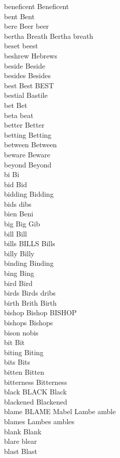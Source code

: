 beneficent Beneficent\\
bent Bent\\
bere Beer beer\\
bertha Breath Bertha breath\\
beset beest\\
beshrew Hebrews\\
beside Beside\\
besides Besides\\
best Best BEST\\
bestial Bastile\\
bet Bet\\
beta beat\\
better Better\\
betting Betting\\
between Between\\
beware Beware\\
beyond Beyond\\
bi Bi\\
bid Bid\\
bidding Bidding\\
bids dibs\\
bien Beni\\
big Big Gib\\
bill Bill\\
bills BILLS Bills\\
billy Billy\\
binding Binding\\
bing Bing\\
bird Bird\\
birds Birds dribs\\
birth Brith Birth\\
bishop Bishop BISHOP\\
bishops Bishops\\
bison nobis\\
bit Bit\\
biting Biting\\
bits Bits\\
bitten Bitten\\
bitterness Bitterness\\
black BLACK Black\\
blackened Blackened\\
blame BLAME Mabel Lambe amble\\
blames Lambes ambles\\
blank Blank\\
blare blear\\
blast Blast\\
